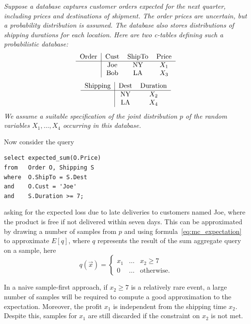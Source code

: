 \begin{example}\em
\label{ex:intro}
Suppose a database captures customer orders expected for the next quarter,
including prices
and destinations of shipment. The order prices are 
uncertain, but a probability distribution is assumed.
The database also stores
distributions of shipping durations for each location.
Here are two c-tables defining such a probabilistic database:
\[
\begin{tabular}{c|ccc}
Order & Cust & ShipTo & Price \\
\hline
& Joe & NY & $X_1$ \\
& Bob & LA & $X_3$ \\
\end{tabular}
\]\[
\begin{tabular}{c|cc}
Shipping & Dest & Duration \\
\hline
& NY & $X_2$ \\
& LA & $X_4$ \\
\end{tabular}
\]
We assume a suitable specification of the joint distribution $p$ of the random
variables $X_1,\dots,X_4$ occurring in this database.

Now consider the query
\begin{verbatim}
select expected_sum(O.Price)
from   Order O, Shipping S
where  O.ShipTo = S.Dest
and    O.Cust = 'Joe'
and    S.Duration >= 7;
\end{verbatim}
asking for the expected loss due to late deliveries to customers named Joe,
where the product is free if not delivered within seven days.
%
This can be approximated by drawing a number of samples from $p$
and using formula~\ref{eq:mc_expectation}
to approximate $E[q]$,
where $q$ represents the result of the sum aggregate query on a sample,
here
\[
q(\vec{x}) =
\left\{
\begin{array}{lll}
x_1 & \dots & x_2 \ge 7 \\
0 & \dots & \mbox{otherwise.}
\end{array}
\right.
\]

In a naive sample-first approach, 
if $x_2 \ge 7$ is a relatively rare event, a large number of samples will be
required to compute a good approximation to the expectation.
Moreover, the profit $x_1$ is independent from the shipping time $x_2$.  Despite this, samples for $x_1$ are still discarded if the constraint on $x_2$ is not met.


\end{example}
